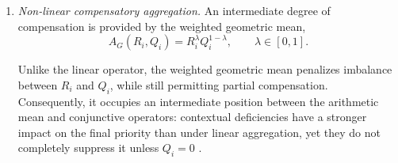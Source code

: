 \documentclass[mathematics,article,submit,moreauthors]{Definitions/mdpi}
\begin{document}
{\begin{enumerate}
\item \emph{Non-linear compensatory aggregation.}
An intermediate degree of compensation is provided by the weighted geometric mean,
\begin{equation}
A_G(R_i,Q_i)=R_i^{\lambda}Q_i^{1-\lambda},
\qquad \lambda\in[0,1].
\end{equation}

Unlike the linear operator, the weighted geometric mean penalizes imbalance between $R_i$ and $Q_i$, while still permitting partial compensation. Consequently, it occupies an intermediate position between the arithmetic mean and conjunctive operators: contextual deficiencies have a stronger impact on the final priority than under linear aggregation, yet they do not completely suppress it unless $Q_i=0$ \citep{Natoli2024,Blancas2024}.

\end{enumerate}
}
\end{document}
